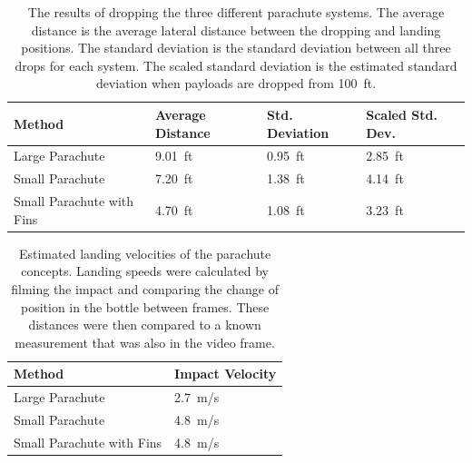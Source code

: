 \documentclass[]{auvsi_doc}
\begin{document}
\begin{table}[h!]
\caption{The results of dropping the three different parachute systems. The average distance is the average lateral distance between the dropping and landing positions. The standard deviation is the standard deviation between all three drops for each system. The scaled standard deviation is the estimated standard deviation when payloads are dropped from 100~ft. }
\label{table:results}

\begin{tabular}{| l | l | l | l |}
\hline
Method & Average Distance & Std. Deviation & Scaled Std. Dev.\\
\hline
Large Parachute & 9.01~ft  & 0.95~ft & 2.85~ft\\
Small Parachute & 7.20~ft  & 1.38~ft & 4.14~ft\\
Small Parachute with Fins & 4.70~ft & 1.08~ft & 3.23~ft\\
\hline

\end{tabular}

\end{table}

\begin{table}[h!]
\caption{Estimated landing velocities of the parachute concepts. Landing speeds were calculated by filming the impact and comparing the change of position in the bottle between frames. These distances were then compared to a known measurement that was also in the video frame.}
\label{table:results_v}

\begin{tabular}{| l | l |}
\hline
Method & Impact Velocity\\
\hline
Large Parachute & 2.7~m/s \\
Small Parachute & 4.8~m/s \\
Small Parachute with Fins & 4.8~m/s \\
\hline

\end{tabular}

\end{table}
\end{document}
